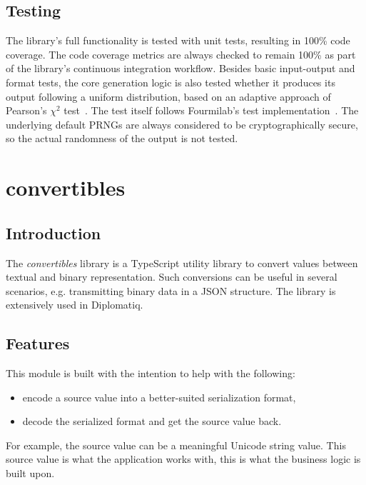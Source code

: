 \subsection{Testing}

The library's full functionality is tested with unit tests, resulting in 100\% code coverage. The code coverage metrics are always checked to remain 100\% as part of the library's continuous integration workflow. Besides basic input-output and format tests, the core generation logic is also tested whether it produces its output following a uniform distribution, based on an adaptive approach of Pearson's $\chi^2$ test~\cite{ryabko2004new}. The test itself follows Fourmilab's test implementation~\cite{fourmilabrandom}. The underlying default PRNGs are always considered to be cryptographically secure, so the actual randomness of the output is not tested.

\section{convertibles}

\subsection{Introduction}

The \emph{convertibles} library is a TypeScript utility library to convert values between textual and binary representation. Such conversions can be useful in several scenarios, e.g. transmitting binary data in a JSON structure. The library is extensively used in Diplomatiq.

\subsection{Features}

This module is built with the intention to help with the following:

\begin{itemize}
\item encode a source value into a better-suited serialization format,
\item decode the serialized format and get the source value back.
\end{itemize}

For example, the source value can be a meaningful Unicode string value. This source value is what the application works with, this is what the business logic is built upon.

